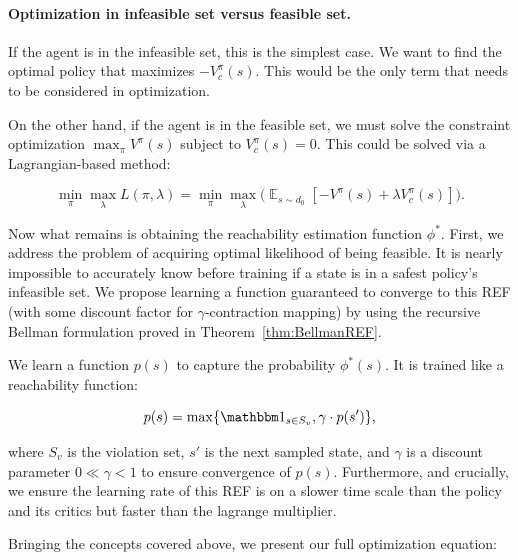 \documentclass{article}
\theoremstyle{definition}
\DeclareMathOperator*{\E}{\mathbb{E}}
\begin{document}
\paragraph{Optimization in infeasible set versus feasible set.} If the agent is in the infeasible set, this is the simplest case. We want to find the optimal policy that maximizes $-V^\pi_c(s)$. This would be the only term that needs to be considered in optimization.

On the other hand, if the agent is in the feasible set, we must solve the constraint optimization $\max_\pi V^\pi(s)$ subject to $V^\pi_c(s) = 0$. This could be solved via a Lagrangian-based method:

\vspace{-15pt}
\[
\min_\pi \max_\lambda L(\pi, \lambda) = \min_\pi \max_\lambda\bigg(\E_{s\sim d_0} [-V^\pi(s) + \lambda V^\pi_c(s)]\bigg).
\]


\vspace{-10pt}
Now what remains is obtaining the reachability estimation function $\phi^*$. First, we address the problem of acquiring optimal likelihood of being feasible. It is nearly impossible to accurately know before training if a state is in a safest policy's infeasible set. We propose learning a function guaranteed to converge to this REF (with some discount factor for $\gamma$-contraction mapping) by using the recursive Bellman formulation proved in Theorem~\ref{thm:BellmanREF}.





We learn a function $p(s)$ to capture the probability $\phi^*(s)$. It is trained like a reachability function:

\vspace{-15pt}
\[
p(s) = \max\{ \mathbbm 1_{s\in S_v}, \gamma \cdot p(s')\},
\]

\vspace{-8pt}
where $S_v$ is the violation set, $s'$ is the next sampled state, and $\gamma$ is a discount parameter $0\ll\gamma<1$ to ensure convergence of $p(s)$. Furthermore, and crucially, we ensure the learning rate of this REF is on a slower time scale than the policy and its critics but faster than the lagrange multiplier.









Bringing the concepts covered above, we present our full optimization equation:
\end{document}
